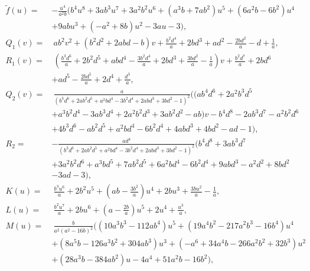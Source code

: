 \documentclass{gtpart}
\theoremstyle{definition}
\theoremstyle{remark}
\newcommand{\Tf}{\widetilde{f}}
\numberwithin{equation}{section}
\numberwithin{thm}{section}
\begin{document}
\begin{equation*}
\begin{split}
 \Tf(u) = & -\frac{u^4}{a^2 b} \big( b^4 u^8 + 3 a b^3 u^7 + 3 a^2 b^2 u^6 + (a^3 b + 7 a b^2) u^5 + (6 a^2 b - 6 b^2) u^4 \\
          & + 9 a b u^3 + (-a^2 + 8 b) u^2 - 3 a u - 3 \big), \\
 Q_1(v) = & ~ a b^2 v^2 + (b^2 d^2 + 2 a b d - b) v + \frac{b^2 d^4}{a} + 2 b d^3 + a d^2 - \frac{2 b d^2}{a} - d + \frac{1}{a}, \\
 R_1(v) = & ~ (\frac{b^3 d^6}{a} + 2 b^2 d^5 + a b d^4 - \frac{3 b^2 d^4}{a} + 2 b d^3 + \frac{3 b d^2}{a} - \frac{1}{a}) v + \frac{b^2 d^7}{a} + 2 b d^6 \\
          & + a d^5 - \frac{2 b d^5}{a} + 2 d^4 + \frac{d^3}{a}, \\
 Q_2(v) = & ~ \frac{a}{(b^3 d^6 + 2 a b^2 d^5 + a^2 b d^4 - 3 b^2 d^4 + 2 a b d^3 + 3 b d^2 - 1)^2} \big( (a b^4 d^6 + 2 a^2 b^3 d^5 \\
          & + a^3 b^2 d^4 - 3 a b^3 d^4 + 2 a^2 b^2 d^3 + 3 a b^2 d^2 - a b) v - b^4 d^8 - 2 a b^3 d^7 - a^2 b^2 d^6 \\
          & + 4 b^3 d^6 - a b^2 d^5 + a^2 b d^4 - 6 b^2 d^4 + 4 a b d^3 + 4 b d^2 - a d - 1 \big), \\
    R_2 = & - \frac{a d^4}{(b^3 d^6 + 2 a b^2 d^5 + a^2 b d^4 - 3 b^2 d^4 + 2 a b d^3 + 3 b d^2 - 1)^2} (b^4 d^8 + 3 a b^3 d^7 \\
          & + 3 a^2 b^2 d^6 + a^3 b d^5 + 7 a b^2 d^5 + 6 a^2 b d^4 - 6 b^2 d^4 + 9 a b d^3 - a^2 d^2 + 8 b d^2 \\
          & - 3 a d - 3), \\
   K(u) = & ~ \frac{b^3 u^6}{a} + 2 b^2 u^5 + (a b - \frac{3 b^2}{a}) u^4 + 2 b u^3 + \frac{3 b u^2}{a} - \frac{1}{a}, \\
   L(u) = & ~ \frac{b^2 u^7}{a} + 2 b u^6 + (a - \frac{2 b}{a}) u^5 + 2 u^4 + \frac{u^3}{a}, \\
   M(u) = & ~ \frac{b}{a^2 (a^2 - 16 b)^2} \big( (10 a^3 b^3 - 112 a b^4) u^5 + (19 a^4 b^2 - 217 a^2 b^3 - 16 b^4) u^4 \\
          & + (8 a^5 b - 126 a^3 b^2 + 304 a b^3) u^3 + (-a^6 + 34 a^4 b -266 a^2 b^2 +32 b^3) u^2 \\
          & + (28 a^3 b - 384 a b^2) u - 4 a^4 + 51 a^2 b - 16 b^2 \big), 
\end{split}
\end{equation*}
\end{document}
